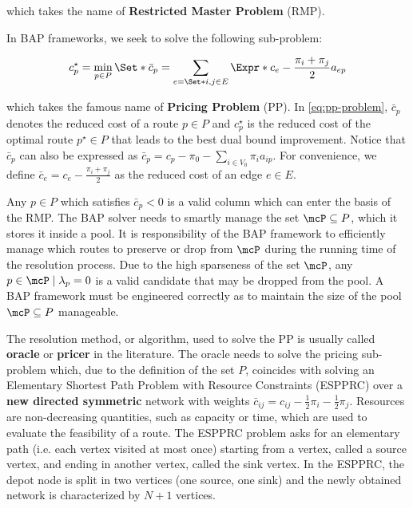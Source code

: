 which takes the name of \textbf{Restricted Master Problem} (RMP).

In BAP frameworks, we seek to solve the following sub-problem:

\begin{equation}\label{eq:pp-problem}
{c^\star_p} = \min_{p \in P} \Set*{ \bar{c}_p = \sum_{e = \Set*{i, j} \in E} \Expr*{c_{e} - \frac{\pi_i + \pi_j}{2}} a_{ep}  }
\end{equation}

which takes the famous name of \textbf{Pricing Problem} (PP).
In \cref{eq:pp-problem}, $\bar{c}_p$ denotes the reduced cost of a route $p \in P$
and $c^\star_p$ is the reduced cost of the optimal route $p^\star \in P$
that leads to the best dual bound improvement.
Notice that $\bar{c}_p$ can also be expressed as $\bar{c}_p = c_p - \pi_0 - \sum_{i \in V_0} \pi_i a_{ip}$.
For convenience,
we define $\bar{c}_{e} = c_{e} - \frac{\pi_i + \pi_j}{2}$
as the reduced cost of an edge $e\in E$.

Any $p \in P$ which satisfies $\bar{c}_p < 0$ is a valid column which can enter the basis of the RMP.
The BAP solver needs to smartly manage the set $\mcP \subseteq P$, which it stores it inside a pool.
It is responsibility of the BAP framework to efficiently manage which routes
to preserve or drop from $\mcP$ during the running time of the resolution process.
Due to the high sparseness of the set $\mcP$, any $p \in \mcP \mid \lambda_p = 0$
is a valid candidate that may be dropped from the pool.
A BAP framework must be engineered correctly as to maintain
the size of the pool $\mcP \subseteq P$ manageable.

\medskip

The resolution method, or algorithm,
used to solve the PP is usually called \textbf{oracle} or \textbf{pricer} in the literature.
The oracle needs to solve the pricing sub-problem which, due to the definition of the set $P$,
coincides with solving an Elementary Shortest Path Problem with Resource Constraints (ESPPRC)
over a \textbf{new directed symmetric} network with weights
$\bar{c}_{ij} = c_{ij} - \frac{1}{2} \pi_i - \frac{1}{2} \pi_j$.
Resources are non-decreasing quantities,
such as capacity or time,
which are used to evaluate
the feasibility of a route.
The ESPPRC problem asks for an elementary path (i.e. each vertex visited at most once) starting
from a vertex, called a source vertex, and ending in another vertex, called the sink vertex.
In the ESPPRC, the depot node is split in two vertices (one source, one sink)
and the newly obtained network is characterized by $N + 1$ vertices.

